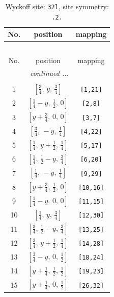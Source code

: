 \documentclass[fleqn,8pt]{jsarticle}
\begin{document}
\begin{longtable}{ccc}
\caption{Wyckoff site: {\tt 32l}, site symmetry: {\tt .2.}}
 \\
 \hline \hline
No. & position & mapping \\ \hline \endfirsthead

\multicolumn{2}{l}{\tablename\ \thetable{}} \\
 \hline \hline
No. & position & mapping \\ \hline \endhead

 \hline \hline
\multicolumn{2}{r}{\footnotesize\it continued ...} \\ \endfoot

 \hline \hline
\multicolumn{2}{r}{} \\ \endlastfoot

1 & $\left[ \frac{3}{4},\, y,\, \frac{3}{4} \right]$ & {\tt [1,21]} \\ \hline
2 & $\left[ \frac{1}{4} - y,\, \frac{1}{2},\, 0 \right]$ & {\tt [2,8]} \\ \hline
3 & $\left[ y + \frac{3}{4},\, 0,\, 0 \right]$ & {\tt [3,7]} \\ \hline
4 & $\left[ \frac{3}{4},\, - y,\, \frac{1}{4} \right]$ & {\tt [4,22]} \\ \hline
5 & $\left[ \frac{1}{4},\, y + \frac{1}{2},\, \frac{1}{4} \right]$ & {\tt [5,17]} \\ \hline
6 & $\left[ \frac{1}{4},\, \frac{1}{2} - y,\, \frac{3}{4} \right]$ & {\tt [6,20]} \\ \hline
7 & $\left[ \frac{1}{4},\, - y,\, \frac{1}{4} \right]$ & {\tt [9,29]} \\ \hline
8 & $\left[ y + \frac{3}{4},\, \frac{1}{2},\, 0 \right]$ & {\tt [10,16]} \\ \hline
9 & $\left[ \frac{1}{4} - y,\, 0,\, 0 \right]$ & {\tt [11,15]} \\ \hline
10 & $\left[ \frac{1}{4},\, y,\, \frac{3}{4} \right]$ & {\tt [12,30]} \\ \hline
11 & $\left[ \frac{3}{4},\, \frac{1}{2} - y,\, \frac{3}{4} \right]$ & {\tt [13,25]} \\ \hline
12 & $\left[ \frac{3}{4},\, y + \frac{1}{2},\, \frac{1}{4} \right]$ & {\tt [14,28]} \\ \hline
13 & $\left[ \frac{3}{4} - y,\, 0,\, \frac{1}{2} \right]$ & {\tt [18,24]} \\ \hline
14 & $\left[ y + \frac{1}{4},\, \frac{1}{2},\, \frac{1}{2} \right]$ & {\tt [19,23]} \\ \hline
15 & $\left[ y + \frac{1}{4},\, 0,\, \frac{1}{2} \right]$ & {\tt [26,32]} \\ \hline

\end{longtable}
\end{document}
